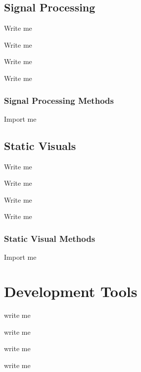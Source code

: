 \documentclass[letterpaper,10pt,english]{sphinxmanual}
\begin{document}
\section{Signal Processing}
\label{\detokenize{Sub-Packages:signal-processing}}\label{\detokenize{Sub-Packages:signal-processing-module}}
\begin{DUlineblock}{0em}
\item[] Write me
\item[] Write me
\item[] Write me
\item[] Write me
\end{DUlineblock}


\subsection{Signal Processing Methods}
\label{\detokenize{Sub-Packages:signal-processing-methods}}
\begin{DUlineblock}{0em}
\item[] Import me
\end{DUlineblock}


\section{Static Visuals}
\label{\detokenize{Sub-Packages:static-visuals}}\label{\detokenize{Sub-Packages:static-visuals-module}}
\begin{DUlineblock}{0em}
\item[] Write me
\item[] Write me
\item[] Write me
\item[] Write me
\end{DUlineblock}


\subsection{Static Visual Methods}
\label{\detokenize{Sub-Packages:static-visual-methods}}
\begin{DUlineblock}{0em}
\item[] Import me
\end{DUlineblock}

\sphinxstepscope


\chapter{Development Tools}
\label{\detokenize{Development Tools:development-tools}}\label{\detokenize{Development Tools::doc}}
\begin{DUlineblock}{0em}
\item[] write me
\item[] write me
\item[] write me
\item[] write me
\end{DUlineblock}
\end{document}
